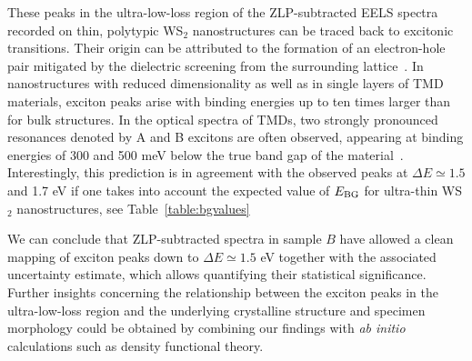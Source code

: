 These peaks in the ultra-low-loss region of the ZLP-subtracted EELS spectra recorded on thin, polytypic
WS$_2$ nanostructures can be traced back to excitonic transitions.
%
Their origin can be attributed to the formation of an electron-hole pair mitigated
by the dielectric screening from the surrounding lattice~\cite{Hanbicki:2016}.
%
In nanostructures with reduced dimensionality as well as in single layers of TMD materials,
exciton peaks arise with binding energies up to ten times larger than for bulk structures.
%
In the optical spectra of TMDs, two strongly pronounced resonances denoted by A and B
excitons are often observed, appearing at binding energies of 300 and
500 meV below the true band gap of the material~\cite{Karivaj:2019}.
%
Interestingly, this prediction is in agreement with the observed peaks at
$\Delta E\simeq 1.5$ and 1.7 eV if one takes into account the expected
value of $E_{\rm BG}$ for ultra-thin  WS$_2$ nanostructures, see Table~\ref{table:bgvalues}

We can conclude that ZLP-subtracted spectra in sample $B$ have allowed
a clean mapping of exciton peaks down to $\Delta E\simeq 1.5$ eV together with
the associated uncertainty estimate, which allows quantifying their statistical significance.
%
Further insights concerning the relationship between the exciton peaks in the ultra-low-loss region
and the underlying crystalline structure and specimen morphology could be obtained
by combining our findings with {\it ab initio} calculations such as density functional theory.
